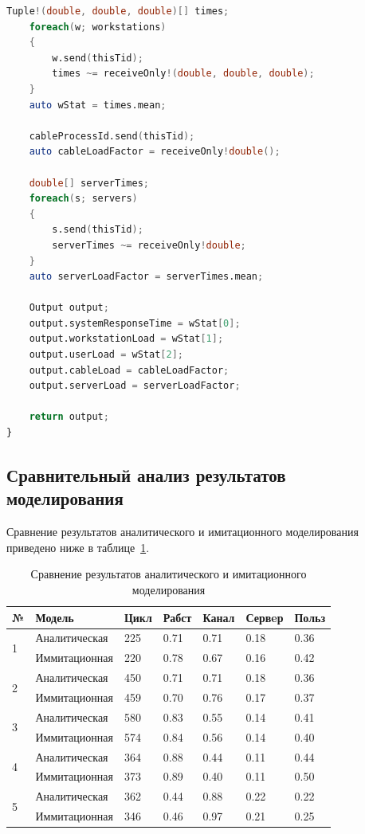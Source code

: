 \documentclass[russian,utf8,emptystyle]{eskdtext}
\begin{document}
\begin{lstlisting}[language=D]
    Tuple!(double, double, double)[] times;
    foreach(w; workstations)
    {
        w.send(thisTid);
        times ~= receiveOnly!(double, double, double);
    }
    auto wStat = times.mean;
    
    cableProcessId.send(thisTid);
    auto cableLoadFactor = receiveOnly!double();
    
    double[] serverTimes;
    foreach(s; servers)
    {
        s.send(thisTid);
        serverTimes ~= receiveOnly!double;
    }
    auto serverLoadFactor = serverTimes.mean;
    
    Output output;
    output.systemResponseTime = wStat[0];
    output.workstationLoad = wStat[1];
    output.userLoad = wStat[2];
    output.cableLoad = cableLoadFactor;
    output.serverLoad = serverLoadFactor;
    
    return output;
}
\end{lstlisting}

\subsection{Сравнительный анализ результатов моделирования}

Сравнение результатов аналитического и имитационного моделирования приведено ниже в таблице~\ref{tab:model-cmp}.

\begin{longtable}{p{0.5cm}|p{4cm}|p{1.5cm}|p{1.5cm}|p{1.5cm}|p{1.5cm}|p{1.5cm}}
\caption{Сравнение результатов аналитического и имитационного моделирования}
\label{tab:model-cmp} \\
 №                 & Модель           & Цикл & Рабст & Канал & Сервeр & Польз \\
\hline
\multirow{2}{*}{1} & Аналитическая    & 225  & 0.71  & 0.71  & 0.18 & 0.36  \\
                   & Иммитационная    & 220  & 0.78  & 0.67  & 0.16 & 0.42  \\
\hline
\multirow{2}{*}{2} & Аналитическая    & 450  & 0.71  & 0.71  & 0.18 & 0.36  \\
                   & Иммитационная    & 459  & 0.70  & 0.76  & 0.17 & 0.37  \\
\hline
\multirow{2}{*}{3} & Аналитическая    & 580  & 0.83  & 0.55  & 0.14 & 0.41  \\
                   & Иммитационная    & 574  & 0.84  & 0.56  & 0.14 & 0.40  \\
\hline
\multirow{2}{*}{4} & Аналитическая    & 364  & 0.88  & 0.44  & 0.11 & 0.44  \\
                   & Иммитационная    & 373  & 0.89  & 0.40  & 0.11 & 0.50  \\
\hline
\multirow{2}{*}{5} & Аналитическая    & 362  & 0.44  & 0.88  & 0.22 & 0.22  \\
                   & Иммитационная    & 346  & 0.46  & 0.97  & 0.21 & 0.25  \\
\end{longtable}
\end{document}
